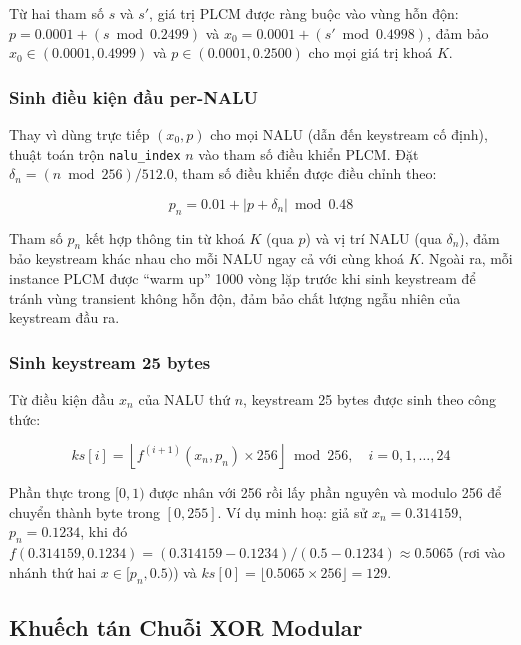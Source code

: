 Từ hai tham số $s$ và $s'$, giá trị PLCM được ràng buộc vào vùng hỗn độn: $p = 0.0001 + (s \bmod 0.2499)$ và $x_0 = 0.0001 + (s' \bmod 0.4998)$, đảm bảo $x_0 \in (0.0001, 0.4999)$ và $p \in (0.0001, 0.2500)$ cho mọi giá trị khoá $K$.

\subsubsection{Sinh điều kiện đầu per-NALU}

Thay vì dùng trực tiếp $(x_0, p)$ cho mọi NALU (dẫn đến keystream cố định), thuật toán trộn \texttt{nalu\_index} $n$ vào tham số điều khiển PLCM. Đặt $\delta_n = (n \bmod 256) / 512.0$, tham số điều khiển được điều chỉnh theo:

\begin{equation}
p_n = 0.01 + \bigl\lvert p + \delta_n \bigr\rvert \bmod 0.48
\label{eq:plcm_nalu}
\end{equation}

Tham số $p_n$ kết hợp thông tin từ khoá $K$ (qua $p$) và vị trí NALU (qua $\delta_n$), đảm bảo keystream khác nhau cho mỗi NALU ngay cả với cùng khoá $K$. Ngoài ra, mỗi instance PLCM được ``warm up'' 1000 vòng lặp trước khi sinh keystream để tránh vùng transient không hỗn độn, đảm bảo chất lượng ngẫu nhiên của keystream đầu ra.

\subsubsection{Sinh keystream 25 bytes}

Từ điều kiện đầu $x_n$ của NALU thứ $n$, keystream 25 bytes được sinh theo công thức:

\begin{equation}
ks[i] = \left\lfloor f^{(i+1)}(x_n, p_n) \times 256 \right\rfloor \bmod 256, \quad i = 0, 1, \ldots, 24
\end{equation}

Phần thực trong $[0, 1)$ được nhân với 256 rồi lấy phần nguyên và modulo 256 để chuyển thành byte trong $[0, 255]$. Ví dụ minh hoạ: giả sử $x_n = 0.314159$, $p_n = 0.1234$, khi đó $f(0.314159, 0.1234) = (0.314159 - 0.1234) / (0.5 - 0.1234) \approx 0.5065$ (rơi vào nhánh thứ hai $x \in [p_n, 0.5)$) và $ks[0] = \lfloor 0.5065 \times 256 \rfloor = 129$.

\subsection{Khuếch tán Chuỗi XOR Modular}

